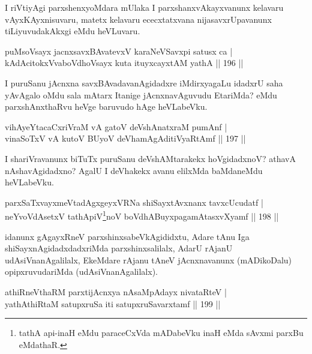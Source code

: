\begin{artha}
I riVtiyAgi parxshenxyoMdara mUlaka I parxshanxvAkayxvanunx kelavaru vAyxKAyxnisuvaru, matetx kelavaru ececxtatxvana nijasavxrUpavanunx tiLiyuvudakAkxgi eMdu heVLuvaru.
\end{artha}

\begin{shl}
puMsoV\s sayx jacnxsavxBAvatevxV karaNeVSavxpi satusx ca |\\
kAdAcitokxV\s vaboVdhoV\s sayx kuta ituyxcayxtAM yathA \hfill || 196 ||
\end{shl}

\begin{artha}
I puruSanu jAcnxna savxBAvadavanAgidadxre iMdirxyagaLu idadxrU saha yAvAgalo oMdu sala mAtarx Itanige jAcnxnavAguvudu EtariMda? eMdu parxshAnxthaRvu heVge baruvudo hAge heVLabeVku.
\end{artha}

\begin{shl}
vihAyeYtacaCxriVraM vA gatoV deVshAnatxraM pumAnf |\\
vinaSoTxV vA kutoV BUyoV deVhamAgAditiVyaRtAmf \hfill || 197 ||
\end{shl}

\begin{artha}
I shariVravanunx biTuTx puruSanu deVshAMtarakekx hoVgidadxnoV? athavA nAshavAgidadxno? AgalU I deVhakekx avanu elilxMda baMdaneMdu heVLabeVku.
\end{artha}

\begin{shl}
parxSaTxvayxmeVtadAgxgeyxVRNa shiSayxtAvxnanx tavxcUcudatf |\\
neYvoVdAsetxV tathA\s piV\footnote{tathA api-inaH eMdu paraceCxVda mADabeVku inaH eMda sAvxmi parxBu eMdathaR.}noV boVdhABuyxpagamAtasxvXyamf \hfill || 198 ||
\end{shl}

\begin{artha}
idanunx gAgayxRneV parxshinxsabeVkAgididxtu, Adare tAnu Iga shiSayxnAgidadxdadxriMda parxshinxsalilalx, AdarU rAjanU udAsiVnanAgalilalx, EkeMdare rAjanu tAneV jAcnxnavanunx (mADikoDalu) opipxruvudariMda (udAsiVnanAgalilalx).
\end{artha}

\begin{shl}
athiRneV\s thaRM parxtijAcnxya nAsaMpAdayx nivataRteV |\\
yathAthiRtaM satupxruSa  iti satupxruSavarxtamf \hfill || 199 ||
\end{shl}

